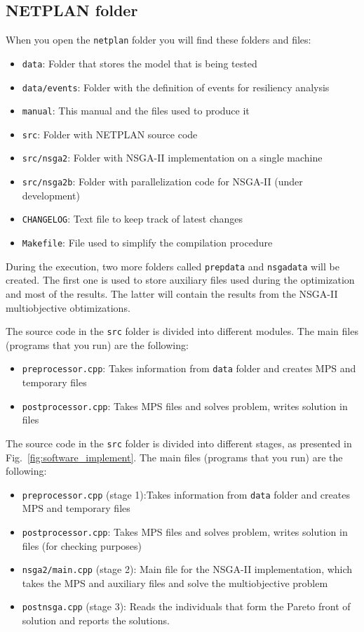 \documentclass{article}
\begin{document}
\subsection{NETPLAN folder}

When you open the \verb=netplan= folder you will find these folders and files:
\begin{itemize}
  \item \verb=data=: Folder that stores the model that is being tested
  \item \verb=data/events=: Folder with the definition of events for resiliency analysis
  \item \verb=manual=: This manual and the files used to produce it
  \item \verb=src=: Folder with NETPLAN source code
  \item \verb=src/nsga2=: Folder with NSGA-II implementation on a single machine
  \item \verb=src/nsga2b=: Folder with parallelization code for NSGA-II (under development)
  \item \verb=CHANGELOG=: Text file to keep track of latest changes
  \item \verb=Makefile=: File used to simplify the compilation procedure
\end{itemize}

During the execution, two more folders called \verb=prepdata= and \verb=nsgadata= will be created. The first one is used to store auxiliary files used during the optimization and most of the results. The latter will contain the results from the NSGA-II multiobjective obtimizations.

The source code in the \verb=src= folder is divided into different modules. The main files (programs that you run) are the following:

\begin{itemize}
  \item \verb=preprocessor.cpp=: Takes information from \verb=data= folder  and creates MPS and temporary files
  \item \verb=postprocessor.cpp=: Takes MPS files and solves problem, writes solution in files
\end{itemize}

The source code in the \verb=src= folder is divided into different stages, as presented in Fig.~\ref{fig:software_implement}. The main files (programs that you run) are the following:

\begin{itemize}
  \item \verb=preprocessor.cpp= (stage 1):Takes information from \verb=data= folder  and creates MPS and temporary files
  \item \verb=postprocessor.cpp=: Takes MPS files and solves problem, writes solution in files (for checking purposes)
  \item \verb=nsga2/main.cpp= (stage 2): Main file for the NSGA-II implementation, which takes the MPS and auxiliary files and solve the multiobjective problem
  \item \verb=postnsga.cpp= (stage 3): Reads the individuals that form the Pareto front of solution and reports the solutions.
\end{itemize}
\end{document}
